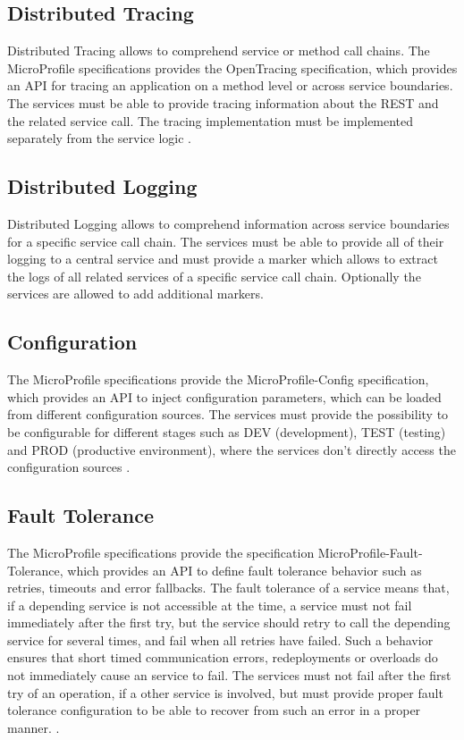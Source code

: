 \subsection{Distributed Tracing}
\label{sec:esboc-design-tracing}
Distributed Tracing allows to comprehend service or method call chains. The MicroProfile specifications provides the OpenTracing specification, which provides an API for tracing an application on a method level or across service boundaries. The services must be able to provide tracing information about the REST and the related service call. The tracing implementation must be implemented separately from the service logic  \cite{CNCFOpentracing2018}.

\subsection{Distributed Logging}
\label{sec:esboc-design-logging}
Distributed Logging allows to comprehend information across service boundaries for a specific service call chain. The services must be able to provide all of their logging to a central service and must provide a marker which allows to extract the logs of all related services of a specific service call chain. Optionally the services are allowed to add additional markers.

\subsection{Configuration}
\label{sec:esboc-design-config}
The MicroProfile specifications provide the MicroProfile-Config specification, which provides an API to inject configuration parameters, which can be loaded from different configuration sources. The services must provide the possibility to be configurable for different stages such as DEV (development), TEST (testing) and PROD (productive environment), where the services don't directly access the configuration sources \cite{EclipseMicroprofileConfig2018}.

\subsection{Fault Tolerance}
\label{sec:esboc-design-fault}
The MicroProfile specifications provide the specification MicroProfile-Fault-Tolerance, which provides an API to define fault tolerance behavior such as retries, timeouts and error fallbacks. The fault tolerance of a service means that, if a depending service is not accessible at the time, a service must not fail immediately after the first try, but the service should retry to call the depending service for several times, and fail when all retries have failed. Such a behavior ensures that short timed communication errors, redeployments or overloads do not immediately cause an service to fail. The services must not fail after the first try of an operation, if a other service is involved, but must provide proper fault tolerance configuration to be able to recover from such an error in a proper manner. \cite{EclipseMicroprofileFault2018}.   

